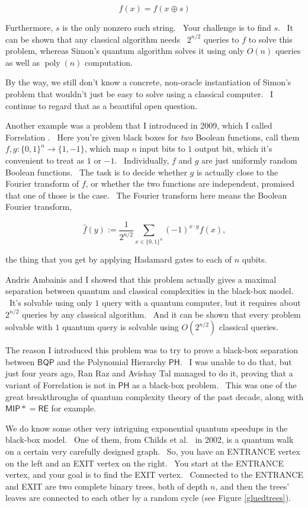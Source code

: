 \documentclass[11pt]{article}
\begin{document}
$$f(x) = f(x\oplus s)$$

\noindent Furthermore, $s$ is the only nonzero such string. \ Your challenge is to find $s$. \ It can be shown that any classical algorithm needs ~$2^{n/2}$ queries to $f$ to solve this problem, whereas Simon's quantum algorithm solves it using only $O(n)$ queries as well as $\operatorname{poly}(n)$ computation.

By the way, we still don't know a concrete, non-oracle instantiation of Simon's problem that wouldn't just be easy to solve using a classical computer. \ I continue to regard that as a beautiful open question.

Another example was a problem that I introduced in 2009, which I called Forrelation \cite{aar:ph}. \ Here you're given black boxes for \emph{two} Boolean functions, call them $f,g: \{0,1\}^n \rightarrow \{1,-1\}$, which map $n$ input bits to $1$ output bit, which it's convenient to treat as $1$ or $-1$. \ Individually, $f$ and $g$ are just uniformly random Boolean functions. \ The task is to decide whether $g$ is actually close to the Fourier transform of $f$, or whether the two functions are independent, promised that one of those is the case. \ The Fourier transform here means the Boolean Fourier transform,

$$\hat{f}(y) := \frac{1}{2^{n/2}} \sum_{x \in \{0,1\}^n} (-1)^{x\cdot y}f(x),$$

\noindent the thing that you get by applying Hadamard gates to each of $n$ qubits.

Andris Ambainis and I \cite{aa:for} showed that this problem actually gives a maximal separation between quantum and classical complexities in the black-box model. \ It's solvable using only $1$ query with a quantum computer, but it requires about $2^{n/2}$ queries by any classical algorithm. \ And it can be shown that every problem solvable with $1$ quantum query is solvable using $O(2^{n/2})$ classical queries.

The reason I introduced this problem was to try to prove a black-box separation between $\mathsf{BQP}$ and the Polynomial Hierarchy $\mathsf{PH}$. \ I was unable to do that, but just four years ago, Ran Raz and Avishay Tal \cite{raztal} managed to do it, proving that a variant of Forrelation is not in $\mathsf{PH}$ as a black-box problem. \ This was one of the great breakthroughs of quantum complexity theory of the past decade, along with $\mathsf{MIP*} = \mathsf{RE}$ \cite{mipre} for example.

We do know some other very intriguing exponential quantum speedups in the black-box model. \ One of them, from Childs et al.\ \cite{ccdfgs} in 2002, is a quantum walk on a certain very carefully designed graph. \ So, you have an ENTRANCE vertex on the left and an EXIT vertex on the right. \ You start at the ENTRANCE vertex, and your goal is to find the EXIT vertex. \ Connected to the ENTRANCE and EXIT are two complete binary trees, both of depth $n$, and then the trees' leaves are connected to each other by a random cycle (see Figure \ref{gluedtrees}).
\end{document}
